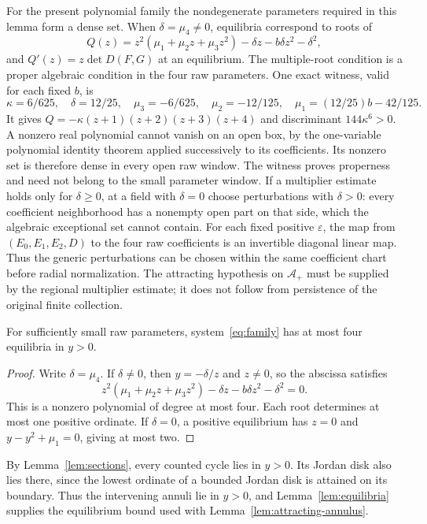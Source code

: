 For the present polynomial family the nondegenerate parameters required
in this lemma form a dense set.  When
$\delta=\mu_4\ne0$, equilibria correspond to roots of
\[
 Q(z)=z^2(\mu_1+\mu_2z+\mu_3z^2)-\delta z-b\delta z^2-\delta^2,
\]
and $Q'(z)=z\det D(F,G)$ at an equilibrium. The multiple-root condition
is a proper algebraic condition in the four raw parameters. One exact
witness, valid for each fixed $b$, is
\[
 \kappa=6/625,\quad\delta=12/25,\quad
 \mu_3=-6/625,\quad\mu_2=-12/125,\quad
 \mu_1=(12/25)b-42/125 .
\]
It gives $Q=-\kappa(z+1)(z+2)(z+3)(z+4)$ and discriminant
$144\kappa^6>0$. A nonzero real polynomial cannot vanish on an open
box, by the one-variable polynomial identity theorem applied
successively to its coefficients. Its nonzero set is therefore dense
in every open raw window. The witness proves properness and need not
belong to the small parameter window. If a multiplier estimate holds
only for $\delta\ge0$, at a field with $\delta=0$ choose perturbations
with $\delta>0$: every coefficient neighborhood has a nonempty open
part on that side, which the algebraic exceptional set cannot contain.
For each fixed positive $\varepsilon$, the map from
$(E_0,E_1,E_2,D)$ to the four raw coefficients is an invertible diagonal
linear map.  Thus the generic perturbations can be chosen within the same
coefficient chart before radial normalization.  The attracting hypothesis
on $\mathcal A_+$ must be supplied by the regional multiplier estimate;
it does not follow from persistence of the original finite collection.

\begin{lemma}\label{lem:equilibria}
For sufficiently small raw parameters, system~\eqref{eq:family}
has at most four equilibria in $y>0$.
\end{lemma}
\begin{proof}
Write $\delta=\mu_4$. If $\delta\ne0$, then $y=-\delta/z$
and $z\ne0$, so the abscissa satisfies
\[
 z^2(\mu_1+\mu_2z+\mu_3z^2)
                    -\delta z-b\delta z^2-\delta^2=0.
\]
This is a nonzero polynomial of degree at most four. Each root
determines at most one positive ordinate. If $\delta=0$, a positive
equilibrium has $z=0$ and $y-y^2+\mu_1=0$, giving at most two.
\end{proof}

By Lemma~\ref{lem:sections}, every counted cycle lies in $y>0$.
Its Jordan disk also lies there, since the lowest ordinate of a bounded
Jordan disk is attained on its boundary. Thus the intervening annuli lie
in $y>0$, and Lemma~\ref{lem:equilibria} supplies the equilibrium bound
used with Lemma~\ref{lem:attracting-annulus}.
